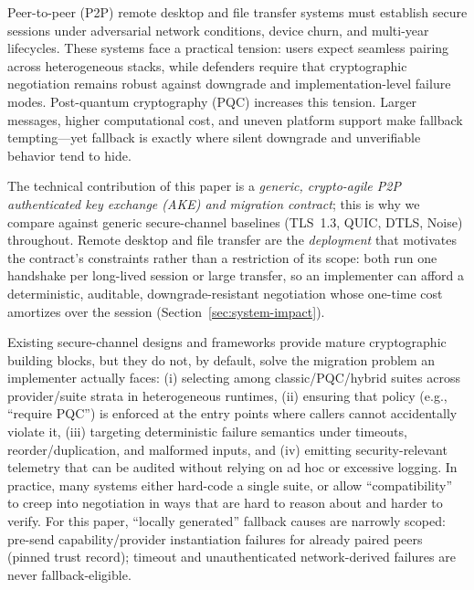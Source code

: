 \documentclass[10pt,journal,compsoc]{IEEEtran}
\begin{document}

\noindent Peer-to-peer (P2P) remote desktop and file transfer systems must
establish secure sessions under adversarial network conditions, device
churn, and multi-year lifecycles. These systems face a practical
tension: users expect seamless pairing across heterogeneous stacks,
while defenders require that cryptographic negotiation remains
robust against downgrade and \mbox{implementation-level} failure modes.
Post-quantum cryptography (PQC) increases this tension. Larger messages,
higher computational cost, and uneven platform support make fallback
tempting---yet fallback is exactly where silent downgrade and
unverifiable behavior tend to hide.

The technical contribution of this paper is a \emph{generic,
crypto-agile P2P authenticated key exchange (AKE) and migration
contract}; this is why we compare against generic secure-channel
baselines (TLS~1.3, QUIC, DTLS, Noise) throughout. Remote desktop and
file transfer are the \emph{deployment} that motivates the contract's
constraints rather than a restriction of its scope: both run one
handshake per long-lived session or large transfer, so an implementer
can afford a deterministic, auditable, downgrade-resistant negotiation
whose one-time cost amortizes over the session
(Section~\ref{sec:system-impact}).

Existing secure-channel designs and frameworks provide mature
cryptographic building blocks, but they do not, by default, solve the
migration problem an implementer actually faces: (i) selecting among
classic/PQC/hybrid suites across provider/suite strata in heterogeneous
runtimes, (ii) ensuring that
policy (e.g., ``require PQC'') is enforced at the entry points where
callers cannot accidentally violate it, (iii) targeting deterministic
failure semantics under timeouts, reorder/duplication, and malformed
inputs, and (iv) emitting security-relevant telemetry that can be
audited without relying on ad hoc or excessive logging. In
practice, many systems either hard-code a single suite, or allow
``compatibility'' to creep into negotiation in ways that are hard to
reason about and harder to verify.
For this paper, ``locally generated'' fallback causes are narrowly scoped:
pre-send capability/provider instantiation failures for already paired
peers (pinned trust record); timeout and unauthenticated network-derived
failures are never fallback-eligible.
\end{document}
